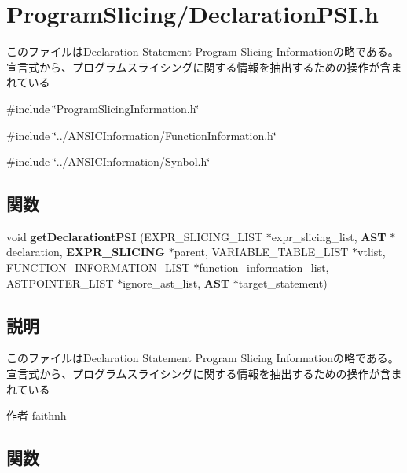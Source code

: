 \section{ProgramSlicing/DeclarationPSI.h}
\label{_declaration_p_s_i_8h}


このファイルはDeclaration Statement Program Slicing Informationの略である。 宣言式から、プログラムスライシングに関する情報を抽出するための操作が含まれている  


{\ttfamily \#include \char`\"{}ProgramSlicingInformation.h\char`\"{}}\par
{\ttfamily \#include \char`\"{}../ANSICInformation/FunctionInformation.h\char`\"{}}\par
{\ttfamily \#include \char`\"{}../ANSICInformation/Synbol.h\char`\"{}}\par
\subsection*{関数}
\begin{DoxyCompactItemize}
\item 
void {\bf getDeclarationtPSI} (EXPR\_\-SLICING\_\-LIST $\ast$expr\_\-slicing\_\-list, {\bf AST} $\ast$declaration, {\bf EXPR\_\-SLICING} $\ast$parent, VARIABLE\_\-TABLE\_\-LIST $\ast$vtlist, FUNCTION\_\-INFORMATION\_\-LIST $\ast$function\_\-information\_\-list, ASTPOINTER\_\-LIST $\ast$ignore\_\-ast\_\-list, {\bf AST} $\ast$target\_\-statement)
\end{DoxyCompactItemize}


\subsection{説明}
このファイルはDeclaration Statement Program Slicing Informationの略である。 宣言式から、プログラムスライシングに関する情報を抽出するための操作が含まれている \begin{DoxyAuthor}{作者}
faithnh 
\end{DoxyAuthor}


\subsection{関数}
